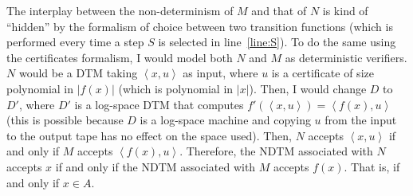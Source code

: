 \documentclass{amsart}
\theoremstyle{plain}
\theoremstyle{definition}
\begin{document}
\begin{enumerate}[label=\textbf{Exercise \arabic*:}, leftmargin=0cm, labelwidth=-0.2cm, align=left]
        The interplay between the non-determinism of $M$ and that of $N$ is kind of ``hidden'' by the formalism
         of choice between two transition functions (which is performed every time a step $S$ is selected
        in line~\ref{line:S}). To do the same using the certificates formalism, I would model both $N$ and $M$ as
        deterministic verifiers. $N$ would be a  DTM taking
        $\left< x, u \right>$ as input, where $u$ is a certificate of size polynomial in $|f(x)|$
        (which is polynomial in $|x|$).
        Then, I would change $D$ to $D'$, where $D'$
        is a log-space DTM that computes $f'(\left< x, u \right>) = \left< f(x), u \right>$
        (this is possible because $D$ is a log-space machine and copying $u$ from the input to the output
        tape has no effect on the space used).
        Then, $N$ accepts $\left< x, u \right>$ if and only if $M$ accepts $\left< f(x), u \right>$.
        Therefore, the NDTM associated with $N$ accepts $x$ if and only if
        the NDTM associated with $M$ accepts $f(x)$.
        That is, if and only if $x \in A$.

    \end{enumerate}
\end{document}
